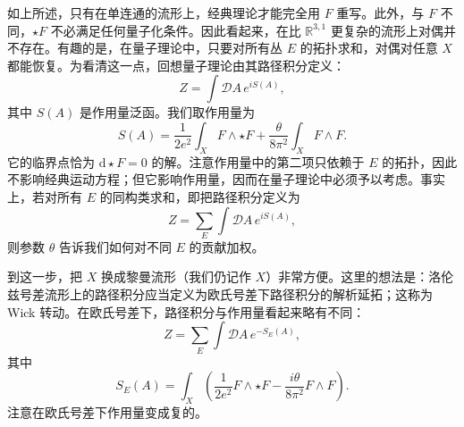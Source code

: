 \documentclass[11pt,a4paper,UTF8]{ctexart}
\begin{document}

如上所述，只有在单连通的流形上，经典理论才能完全用 $F$ 重写。此外，与 $F$ 不同，$\star F$ 不必满足任何量子化条件。因此看起来，在比 $\mathbb{R}^{3,1}$ 更复杂的流形上对偶并不存在。有趣的是，在量子理论中，只要对所有丛 $E$ 的拓扑求和，对偶对任意 $X$ 都能恢复。为看清这一点，回想量子理论由其路径积分定义：
\[
    Z=\int \mathcal{D}A\, e^{iS(A)},
\]
其中 $S(A)$ 是作用量泛函。我们取作用量为
\[
    S(A)=\frac{1}{2e^{2}}\int_{X}F\wedge\star F+\frac{\theta}{8\pi^{2}}\int_{X}F\wedge F .
\]
它的临界点恰为 $\mathrm{d}\star F=0$ 的解。注意作用量中的第二项只依赖于 $E$ 的拓扑，因此不影响经典运动方程；但它影响作用量，因而在量子理论中必须予以考虑。事实上，若对所有 $E$ 的同构类求和，即把路径积分定义为
\[
    Z=\sum_{E}\int \mathcal{D}A\, e^{iS(A)},
\]
则参数 $\theta$ 告诉我们如何对不同 $E$ 的贡献加权。


到这一步，把 $X$ 换成黎曼流形（我们仍记作 $X$）非常方便。这里的想法是：洛伦兹号差流形上的路径积分应当定义为欧氏号差下路径积分的解析延拓；这称为 Wick 转动。在欧氏号差下，路径积分与作用量看起来略有不同：
\[
    Z=\sum_{E}\int \mathcal{D}A\, e^{-S_{E}(A)},
\]
其中
\[
    S_{E}(A)=\int_{X}\left(\frac{1}{2e^{2}}F\wedge\star F-\frac{i\theta}{8\pi^{2}}F\wedge F\right).
\]
注意在欧氏号差下作用量变成复的。

\end{document}

